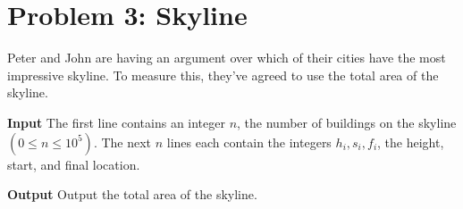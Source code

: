 \normalfont\documentclass[letterpaper,11pt]{article}
\begin{document}
\newpage

\section*{Problem 3: Skyline}
Peter and John are having an argument over which of their cities have the most impressive skyline. To measure this, they've agreed to use the total area of the skyline.

\textbf{Input} \newline
The first line contains an integer $n$, the number of buildings on the skyline $(0 \leq n \leq 10^5)$. \newline
The next $n$ lines each contain the integers $h_i, s_i, f_i$, the height, start, and final location.

\textbf{Output} \newline
Output the total area of the skyline.
\end{document}
